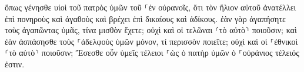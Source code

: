 \documentclass{openreader}
\begin{document}
ὅπως γένησθε υἱοὶ τοῦ πατρὸς ὑμῶν τοῦ ⸀ἐν οὐρανοῖς, ὅτι τὸν ἥλιον αὐτοῦ ἀνατέλλει ἐπὶ πονηροὺς καὶ ἀγαθοὺς καὶ βρέχει ἐπὶ δικαίους καὶ ἀδίκους. 
ἐὰν γὰρ ἀγαπήσητε τοὺς ἀγαπῶντας ὑμᾶς, τίνα μισθὸν ἔχετε; οὐχὶ καὶ οἱ τελῶναι ⸂τὸ αὐτὸ⸃ ποιοῦσιν; 
καὶ ἐὰν ἀσπάσησθε τοὺς ⸀ἀδελφοὺς ὑμῶν μόνον, τί περισσὸν ποιεῖτε; οὐχὶ καὶ οἱ ⸀ἐθνικοὶ ⸂τὸ αὐτὸ⸃ ποιοῦσιν; 
Ἔσεσθε οὖν ὑμεῖς τέλειοι ⸀ὡς ὁ πατὴρ ὑμῶν ὁ ⸀οὐράνιος τέλειός ἐστιν. 
\end{document}
